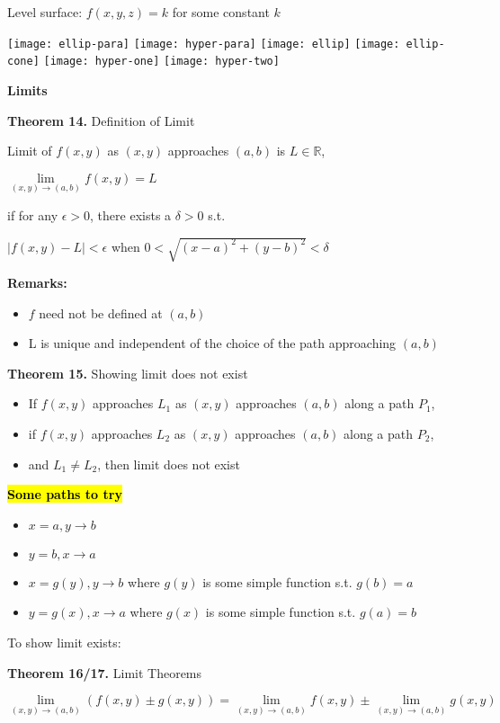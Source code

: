 \documentclass{article}
\newcommand{\headingsmall}[1]{{\small\textbf{#1}}}
\begin{document}
\begin{multicols*}{4}
Level surface: $f(x,y,z)=k$ for some constant $k$

\texttt{[image: ellip-para]}
\texttt{[image: hyper-para]}
\texttt{[image: ellip]}
\texttt{[image: ellip-cone]}
\texttt{[image: hyper-one]}
\texttt{[image: hyper-two]}

\vfill\null
\columnbreak

\headingsmall{Limits}

\textbf{Theorem 14.} Definition of Limit

Limit of $f(x,y)$ as $(x,y)$ approaches $(a,b)$ is $L\in\mathbb{R}$,
\centerline{$\lim\limits_{(x,y)\to(a,b)}f(x,y)=L$}
if for any $\epsilon>0$, there exists a $\delta > 0$ s.t.

$|f(x,y)-L|<\epsilon$ when $0<\sqrt{(x-a)^2+(y-b)^2}<\delta$

\textbf{Remarks:}
\begin{itemize}[nosep]
	\item $f$ need not be defined at $(a,b)$
	\item L is unique and independent of the choice of the path approaching $(a,b)$
\end{itemize}

\textbf{Theorem 15.} Showing limit does not exist
\begin{itemize}[nosep]
	\item If $f(x,y)$ approaches $L_1$ as $(x,y)$ approaches $(a,b)$ along a path $P_1$,
	\item if $f(x,y)$ approaches $L_2$ as $(x,y)$ approaches $(a,b)$ along a path $P_2$,
	\item and $L_1 \neq L_2$, then limit does not exist	
\end{itemize}
\hl{\textbf{Some paths to try}}
\begin{itemize}[nosep]
	\item $x=a,y\to b$
	\item $y=b,x\to a$
	\item $x=g(y),y\to b$ where $g(y)$ is some simple function s.t. $g(b)=a$
	\item $y=g(x),x\to a$ where $g(x)$ is some simple function s.t. $g(a)=b$
\end{itemize}
To show limit exists: 

\textbf{Theorem 16/17.} Limit Theorems

\mbox{$\lim\limits_{(x,y)\to(a,b)}(f(x,y)\pm g(x,y))=\lim\limits_{(x,y)\to(a,b)}f(x,y)\pm \lim\limits_{(x,y)\to(a,b)}g(x,y)$}


\end{multicols*}
\end{document}
